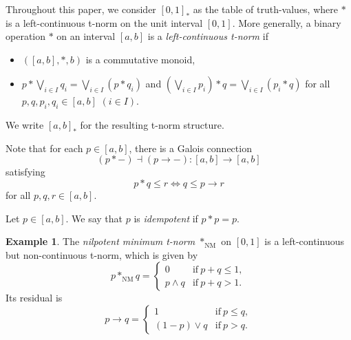 \documentclass{birkau}
\theoremstyle{plain}
\theoremstyle{definition}
\newtheorem{exmp}[thm]{Example}
\newcommand{\ra}{\rightarrow}
\newcommand{\dv}{\dashv}
\renewcommand{\leq}{\leqslant}
\numberwithin{equation}{section}
\begin{document}
Throughout this paper, we consider $[0,1]_*$ as the table of truth-values, where $*$ is a left-continuous t-norm on the unit interval $[0,1]$. More generally, a binary operation $*$ on an interval $[a,b]$ is a \emph{left-continuous t-norm} \cite{Klement2000,Klement2004b,Alsina2006} if
\begin{itemize}
\item $([a,b],*,b)$ is a commutative monoid,
\item $p*\bigvee\limits_{i\in I}q_{i}=\bigvee\limits_{i\in I}(p*q_{i})$ and $(\bigvee\limits_{i\in I}p_{i})*q=\bigvee\limits_{i\in I}(p_{i}*q)$ for all $p,q,p_i,q_i\in[a,b]$ $(i\in I)$.
\end{itemize}
We write $[a,b]_*$ for the resulting t-norm structure.


Note that for each $p\in[a,b]$, there is a Galois connection
\[(p*-)\dv(p\ra -)\colon[a,b]\to[a,b]\]
satisfying
\[p*q\leq r\iff q\leq p\ra r\]
for all $p,q,r\in[a,b]$. 

Let $p\in[a,b]$. We say that $p$ is \emph{idempotent} if $p*p=p$.


\begin{exmp} \label{MLP-def}
The \emph{nilpotent minimum t-norm} $*_{\mathrm{NM}}$ on $[0,1]$ is a left-continuous but non-continuous t-norm, which is given by
\[
p*_{\mathrm{NM}}q=
\begin{cases}
0 & \text{if}\ p+q\leq1,\\
p\wedge q & \text{if}\ p+q>1.
\end{cases}
\]
Its residual is
\[
p\ra q=
\begin{cases}
1 & \text{if}\ p\leq q,\\
(1-p)\vee q & \text{if}\ p>q.
\end{cases}
\]
\end{exmp}
\end{document}
